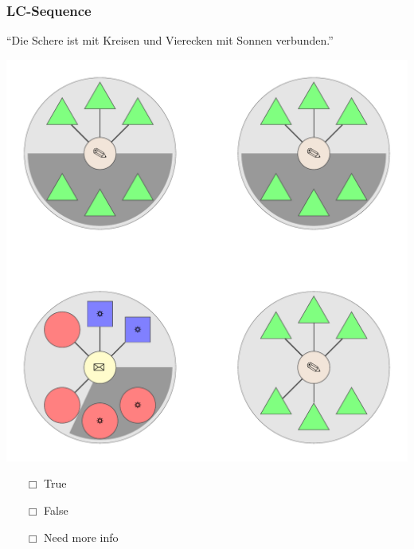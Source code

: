 \documentclass[fleqn,10pt,serif,xcolor=dvipsnames]{beamer}
\newcommand{\LC}{LC}
\newcommand{\mymark}[1]{{\color{blue}{#1}}}
\begin{document}
\begin{frame}
  \frametitle{\LC-Sequence}
  \begin{center}
    ``Die Schere ist mit Kreisen und Vierecken mit Sonnen verbunden.''

    \vspace{0.1cm}

    \includegraphics[width=0.5 \textwidth]{../../pictures/lc_01_5.pdf}

    \vspace{0.1cm}

    \begin{multicols}{3}
      \begin{itemize} 
      \item[$\Box$] True\\
        \onslide<2>{$\leadsto$  \mymark{false}}
      \item[$\Box$] False\\
        \onslide<2>{$\leadsto$ \mymark{false}}
      \item[$\Box$] Need more info 
      \end{itemize}
    \end{multicols}

  \end{center}
\end{frame}
\end{document}
